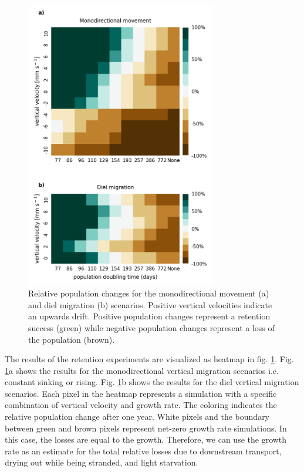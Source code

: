 \documentclass[npg, manuscript]{copernicus}
\begin{document}
\begin{figure}
    \includegraphics[width=8.3cm]{figures/retention_success_combined.png}
    \caption[]{
        Relative population changes for the monodirectional movement (a) and diel migration (b) scenarios. Positive vertical velocities indicate an upwards drift. Positive population changes represent a retention success (green) while negative population changes represent a loss of the population (brown).
        }
    \label{fig:retention_success}
\end{figure}

The results of the retention experiments are visualized as heatmap in fig. \ref{fig:retention_success}.
Fig. \ref{fig:retention_success}a shows the results for the monodirectional vertical migration scenarios i.e. constant sinking or rising. Fig. \ref{fig:retention_success}b shows the results for the diel vertical migration scenarios. Each pixel in the heatmap represents a simulation with a specific combination of vertical velocity and growth rate. The coloring indicates the relative population change after one year. White pixels and the boundary between green and brown pixels represent net-zero growth rate simulations. In this case, the losses are equal to the growth. Therefore, we can use the growth rate as an estimate for the total relative losses due to downstream transport, drying out while being stranded, and light starvation.
\end{document}
